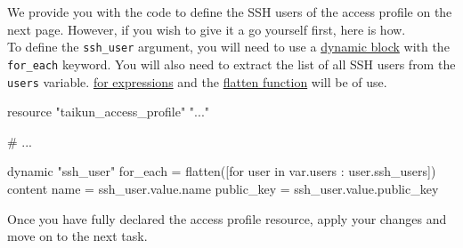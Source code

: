 We provide you with the code to define the SSH users of the access profile on the next page.
However, if you wish to give it a go yourself first, here is how.\\

To define the \texttt{ssh\_user} argument, you will need to use a
\href{https://www.terraform.io/docs/language/expressions/dynamic-blocks.html}{dynamic block}
with the \texttt{for\_each} keyword.
You will also need to extract the list of all SSH users from the \texttt{users} variable.
\href{https://www.terraform.io/docs/language/expressions/for.html}{for expressions} and
the \href{https://www.terraform.io/docs/language/functions/flatten.html}{flatten function}
will be of use.\\
\pagebreak
\begin{tf}
resource "taikun_access_profile" "..." {

  # ...
  
  dynamic "ssh_user" {
    for_each = flatten([for user in var.users : user.ssh_users])
    content {
      name       = ssh_user.value.name
      public_key = ssh_user.value.public_key
    }
  }
}
\end{tf}

Once you have fully declared the access profile resource, apply your changes and move on to the next task.
